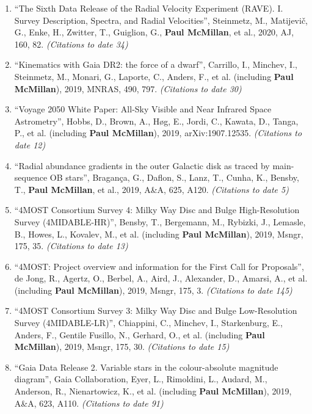 \documentclass{resume}
\begin{document}
\begin{enumerate}
\item ``The Sixth Data Release of the Radial Velocity Experiment (RAVE). I. Survey Description, Spectra, and Radial Velocities'', Steinmetz, M., Matijevi\v{c}, G., Enke, H., Zwitter, T., Guiglion, G., \textbf{Paul McMillan}, et al., 2020, AJ, 160, 82. \textit{(Citations to date 34)}

\item ``Kinematics with Gaia DR2: the force of a dwarf'', Carrillo, I., Minchev, I., Steinmetz, M., Monari, G., Laporte, C., Anders, F., et al. (including \textbf{Paul McMillan}), 2019, MNRAS, 490, 797. \textit{(Citations to date 30)}

\item ``Voyage 2050 White Paper: All-Sky Visible and Near Infrared Space Astrometry'', Hobbs, D., Brown, A., H{\o}g, E., Jordi, C., Kawata, D., Tanga, P., et al. (including \textbf{Paul McMillan}), 2019, arXiv:1907.12535. \textit{(Citations to date 12)}

\item ``Radial abundance gradients in the outer Galactic disk as traced by main-sequence OB stars'', Bragan\c{c}a, G., Daflon, S., Lanz, T., Cunha, K., Bensby, T., \textbf{Paul McMillan}, et al., 2019, A\&A, 625, A120. \textit{(Citations to date 5)}

\item ``4MOST Consortium Survey 4: Milky Way Disc and Bulge High-Resolution Survey (4MIDABLE-HR)'', Bensby, T., Bergemann, M., Rybizki, J., Lemasle, B., Howes, L., Kovalev, M., et al. (including \textbf{Paul McMillan}), 2019, Msngr, 175, 35. \textit{(Citations to date 13)}

\item ``4MOST: Project overview and information for the First Call for Proposals'', de Jong, R., Agertz, O., Berbel, A., Aird, J., Alexander, D., Amarsi, A., et al. (including \textbf{Paul McMillan}), 2019, Msngr, 175, 3. \textit{(Citations to date 145)}

\item ``4MOST Consortium Survey 3: Milky Way Disc and Bulge Low-Resolution Survey (4MIDABLE-LR)'', Chiappini, C., Minchev, I., Starkenburg, E., Anders, F., Gentile Fusillo, N., Gerhard, O., et al. (including \textbf{Paul McMillan}), 2019, Msngr, 175, 30. \textit{(Citations to date 15)}

\item ``Gaia Data Release 2. Variable stars in the colour-absolute magnitude diagram'', Gaia Collaboration, Eyer, L., Rimoldini, L., Audard, M., Anderson, R., Nienartowicz, K., et al. (including \textbf{Paul McMillan}), 2019, A\&A, 623, A110. \textit{(Citations to date 91)}


\end{enumerate}
\end{document}
